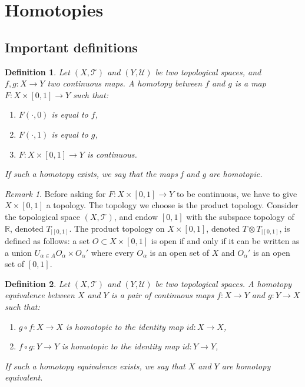 \documentclass[a4paper,11pt]{article}
\theoremstyle{mytheor}
\newtheorem{definition}{Definition}[subsection]
\theoremstyle{mytheor}
\theoremstyle{remark}
\newtheorem*{remark}{Remark}
\newcommand{\T}{\mathcal{T}}
\newcommand{\U}{\mathcal{U}}
\newcommand{\R}{\mathbb{R}}
\begin{document}
\section{Homotopies}

\subsection{Important definitions}

\begin{definition}
    Let $(X, \T)$ and $(Y, \U)$ be two topological spaces, and $f, g : X \to Y$
    two continuous maps. A homotopy between $f$ and $g$ is a map $F : X \times
    [0, 1] \to Y$ such that:
    \begin{enumerate}
        \item $F(\cdot, 0)$ is equal to $f$, 
        \item $F(\cdot, 1)$ is equal to $g$, 
        \item $F : X \times [0, 1] \to Y$ is continuous.
    \end{enumerate}
    If such a homotopy exists, we say that the maps f and g are homotopic.
\end{definition}

\begin{remark}
    Before asking for $F : X \times [0, 1] \to Y$ to be continuous, we have to
    give $X \times [0, 1]$ a topology. The topology we choose is the product
    topology. Consider the topological space $(X, \T)$, and endow $[0, 1]$
    with the subspace topology of $\R$, denoted $T_{|[0,1]}$. The product
    topology on $X \times [0, 1]$, denoted $T \otimes T_{|[0,1]}$, is defined
    as follows: a set $O \subset X \times [0, 1]$ is open if and only if it
    can be written as a union $U_{\alpha \in A} O_{\alpha} \times O_{\alpha}'$
    where every $O_{\alpha}$ is an open set of $X$ and $O_{\alpha}'$ is an open set of $[0, 1]$.
\end{remark}
 
\begin{definition}
    Let $(X, \T)$ and $(Y, \U)$ be two topological spaces. A homotopy
    equivalence between $X$ and $Y$ is a pair of continuous maps $f : X \to Y$
    and $g : Y \to X$ such that:
    \begin{enumerate}
        \item $g \circ f : X \to X$ is homotopic to the identity map $id: X \to X$,
        \item $f \circ g : Y \to Y$ is homotopic to the identity map $id: Y \to Y$,
    \end{enumerate}
    If such a homotopy equivalence exists, we say that $X$ and $Y$ are homotopy equivalent.   
\end{definition}
\end{document}

